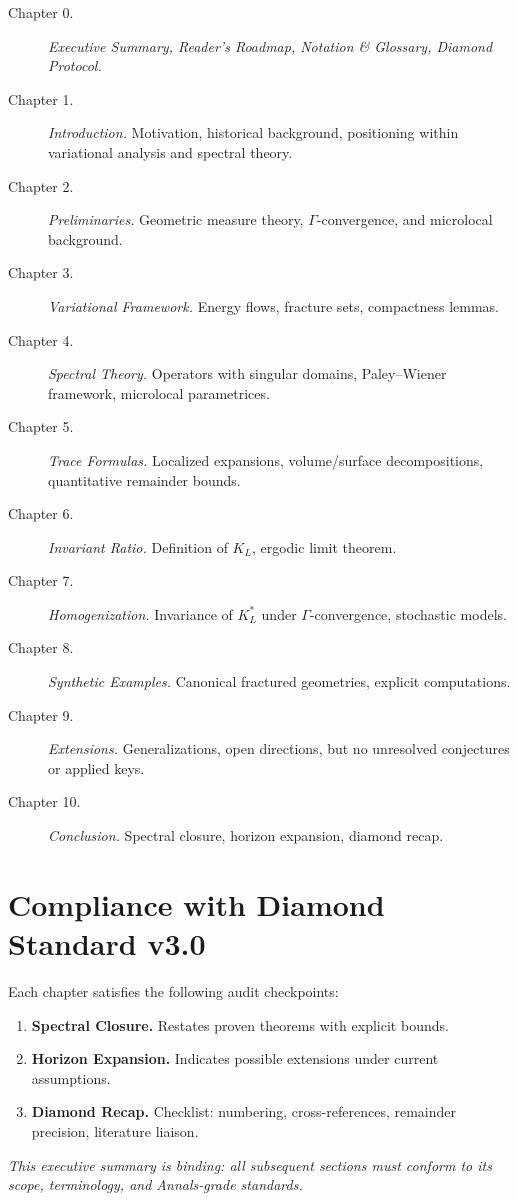 \begin{description}
  \item[Chapter 0.] \emph{Executive Summary, Reader’s Roadmap, Notation \& Glossary, Diamond Protocol.}
  \item[Chapter 1.] \emph{Introduction.} Motivation, historical background, 
  positioning within variational analysis and spectral theory.
  \item[Chapter 2.] \emph{Preliminaries.} Geometric measure theory, 
  $\Gamma$-convergence, and microlocal background.
  \item[Chapter 3.] \emph{Variational Framework.} Energy flows, fracture sets, 
  compactness lemmas.
  \item[Chapter 4.] \emph{Spectral Theory.} Operators with singular domains, 
  Paley–Wiener framework, microlocal parametrices.
  \item[Chapter 5.] \emph{Trace Formulas.} Localized expansions, volume/surface 
  decompositions, quantitative remainder bounds.
  \item[Chapter 6.] \emph{Invariant Ratio.} Definition of $K_L$, ergodic limit theorem.
  \item[Chapter 7.] \emph{Homogenization.} Invariance of $K_L^*$ under 
  $\Gamma$-convergence, stochastic models.
  \item[Chapter 8.] \emph{Synthetic Examples.} Canonical fractured geometries, 
  explicit computations.
  \item[Chapter 9.] \emph{Extensions.} Generalizations, open directions, but 
  no unresolved conjectures or applied keys.
  \item[Chapter 10.] \emph{Conclusion.} Spectral closure, horizon expansion, 
  diamond recap.
\end{description}

\section*{Compliance with Diamond Standard v3.0}

Each chapter satisfies the following audit checkpoints:
\begin{enumerate}[label=\textbf{D\arabic*}.]
  \item \textbf{Spectral Closure.} Restates proven theorems with explicit bounds.
  \item \textbf{Horizon Expansion.} Indicates possible extensions under current assumptions.
  \item \textbf{Diamond Recap.} Checklist: numbering, cross-references, remainder precision, literature liaison.
\end{enumerate}

\bigskip
\noindent
\emph{This executive summary is binding: all subsequent sections must conform to its scope, terminology, and Annals-grade standards.}
